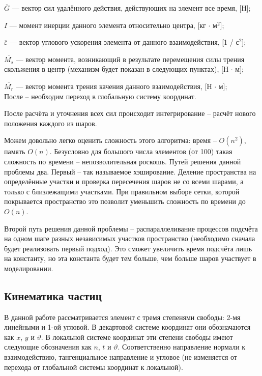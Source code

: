 \documentclass[a4paper]{article}
\begin{document}
$\overline{G}$ --- вектор сил удалённого действия, действующих на элемент все время, [Н];

$I$ --- момент инерции данного элемента относительно центра, [кг $ \cdot $ м$^2$];

$ \overline{\varepsilon}$ --- вектор углового ускорения элемента от данного взаимодействия, [1 / с$^2$];

$ \overline{M_s}$ --- вектор момента, возникающий в результате перемещения силы трения скольжения в центр (механизм будет показан в следующих пунктах), [Н $ \cdot $ м];

$\overline{M_r}$ --- вектор момента трения качения данного взаимодействия, [Н $ \cdot $ м];
\\

После -- необходим переход в глобальную систему координат.

После расчёта и уточнения всех сил происходит интегрирование -- расчёт нового положения каждого из шаров.

Можем довольно легко оценить сложность этого алгоритма: время -- $O(n^2)$, память $O(n)$. 
Безусловно для большого числа элементов (от 100) такая сложность по времени -- непозволительная роскошь.
Путей решения данной проблемы два.
Первый -- так называемое хэширование. 
Деление пространства на определённые участки и проверка пересечения шаров не со всеми шарами, а только с близлежащими участками.
При правильном выборе сетки, которой покрывается пространство это позволит уменьшить сложность по времени до $O(n)$.

Второй путь решения данной проблемы -- распараллеливание процессов подсчёта на одном шаге разных независимых участков пространство (необходимо сначала будет реализовать первый подход). Это сможет увеличить время подсчёта лишь на константу, но эта константа будет тем больше, чем больше шаров участвует в моделировании.


\subsection{Кинематика частиц}
\label{kinem_subsection}

В данной работе рассматривается элемент с тремя степенями свободы: 2-мя линейными и 1-ой угловой.
В декартовой системе координат они обозначаются как $x$, $y$ и $\vartheta$.
В локальной системе координат эти степени свободы имеют следующие обозначения как $n$, $t$ и $\vartheta$. Соответственно направление нормали к взаимодействию, тангенциальное направление и угловое (не изменяется от перехода от глобальной системы координат к локальной).
\end{document}
